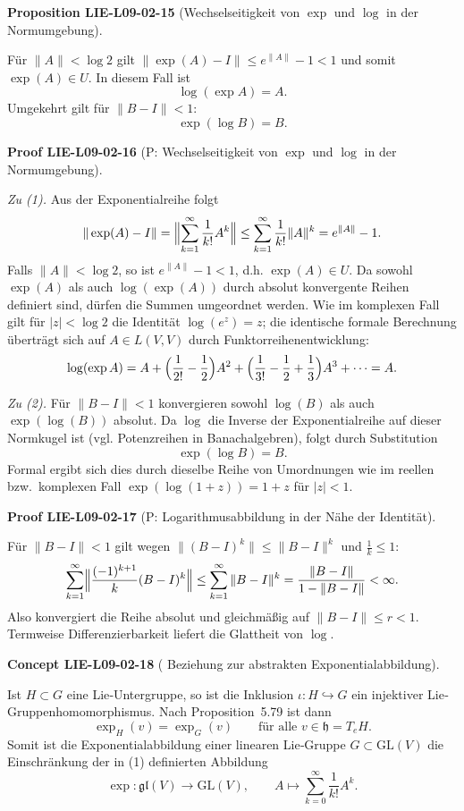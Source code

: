 \documentclass[10pt, letterpaper]{article}
\newcommand{\GL}{\mathrm{GL}}
\newcommand{\CustomHeading}[3]{%
  \par\medskip\noindent%
  \textbf{#1 #2} \textnormal{(#3)}.\enskip%
}
\newenvironment{PROP}[2]{\CustomHeading{Proposition}{#1}{#2}}{}
\newenvironment{CONC}[2]{\CustomHeading{Concept}{#1}{#2}}{}
\newenvironment{PROOF}[2]{\CustomHeading{Proof}{#1}{#2}}{}
\begin{document}
\begin{PROP}{LIE-L09-02-15}{Wechselseitigkeit von $\exp$ und $\log$ in der Normumgebung}
Für $\|A\|<\log 2$ gilt $\|\exp(A)-I\|\le e^{\|A\|}-1<1$ und somit $\exp(A)\in U$.
In diesem Fall ist
\[
\log(\exp A)=A.
\]
Umgekehrt gilt für $\|B-I\|<1$:
\[
\exp(\log B)=B.
\]
\end{PROP}

\begin{PROOF}{LIE-L09-02-16}{P: Wechselseitigkeit von $\exp$ und $\log$ in der Normumgebung}
\emph{Zu (1).}
Aus der Exponentialreihe folgt
\[
\|\exp(A)-I\|
=\Bigl\|\sum_{k=1}^{\infty}\frac{1}{k!}A^k\Bigr\|
\le \sum_{k=1}^{\infty}\frac{1}{k!}\|A\|^k
=e^{\|A\|}-1.
\]
Falls $\|A\|<\log 2$, so ist $e^{\|A\|}-1<1$, d.h. $\exp(A)\in U$.
Da sowohl $\exp(A)$ als auch $\log(\exp(A))$ durch absolut konvergente Reihen definiert sind,
dürfen die Summen umgeordnet werden. Wie im komplexen Fall gilt für $|z|<\log 2$ die Identität
$\log(e^z)=z$; die identische formale Berechnung überträgt sich auf $A\in L(V,V)$
durch Funktorreihenentwicklung:
\[
\log(\exp A)=A+\Bigl(\frac{1}{2!}-\frac{1}{2}\Bigr)A^2
+\Bigl(\frac{1}{3!}-\frac{1}{2}+\frac{1}{3}\Bigr)A^3+\cdots=A.
\]

\smallskip
\emph{Zu (2).}
Für $\|B-I\|<1$ konvergieren sowohl $\log(B)$ als auch $\exp(\log(B))$ absolut.
Da $\log$ die Inverse der Exponentialreihe auf dieser Normkugel ist (vgl. Potenzreihen in Banachalgebren),
folgt durch Substitution
\[
\exp(\log B)=B.
\]
Formal ergibt sich dies durch dieselbe Reihe von Umordnungen wie im reellen bzw.\ komplexen Fall
$\exp(\log(1+z))=1+z$ für $|z|<1$.
\end{PROOF}

\begin{PROOF}{LIE-L09-02-17}{P: Logarithmusabbildung in der Nähe der Identität}
Für $\|B-I\|<1$ gilt wegen $\|(B-I)^k\|\le \|B-I\|^k$ und $\frac{1}{k}\le 1$:
\[
\sum_{k=1}^{\infty}\Bigl\|\frac{(-1)^{k+1}}{k}(B-I)^k\Bigr\|
\le \sum_{k=1}^{\infty}\|B-I\|^k
=\frac{\|B-I\|}{1-\|B-I\|}<\infty.
\]
Also konvergiert die Reihe absolut und gleichmäßig auf $\|B-I\|\le r<1$.
Termweise Differenzierbarkeit liefert die Glattheit von $\log$.
\end{PROOF}

\begin{CONC}{LIE-L09-02-18}{ Beziehung zur abstrakten Exponentialabbildung}
Ist $H\subset G$ eine Lie‐Untergruppe, so ist die Inklusion $\iota:H\hookrightarrow G$
ein injektiver Lie‐Gruppenhomomorphismus. Nach Proposition~5.79 ist dann
\[
\exp_H(v)=\exp_G(v)\qquad\text{für alle }v\in\mathfrak h=T_eH.
\]
Somit ist die Exponentialabbildung einer linearen Lie‐Gruppe $G\subset\GL(V)$
die Einschränkung der in (1) definierten Abbildung
\[
\exp:\mathfrak{gl}(V)\to\GL(V),
\qquad
A\mapsto\sum_{k=0}^{\infty}\frac{1}{k!}A^k.
\]
\end{CONC}
\end{document}
